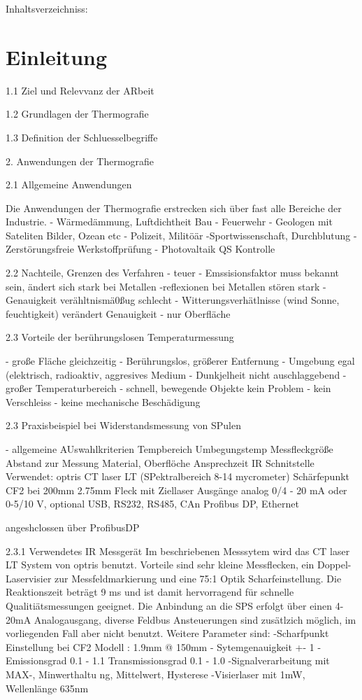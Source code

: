 Inhaltsverzeichniss:

\section{Einleitung}

	1.1 Ziel und Relevvanz der ARbeit

	1.2 Grundlagen der Thermografie

	1.3 Definition der Schluesselbegriffe

2. Anwendungen der Thermografie

	2.1 Allgemeine Anwendungen
		
		Die Anwendungen der Thermografie erstrecken sich über fast alle Bereiche der Industrie.
		- Wärmedämmung, Luftdichtheit Bau
		- Feuerwehr
		- Geologen mit Sateliten Bilder, Ozean etc
		- Polizeit, Militöär
		-Sportwissenschaft, Durchblutung
		- Zerstörungsfreie Werkstoffprüfung
		- Photovaltaik QS Kontrolle
	
	2.2 Nachteile, Grenzen des Verfahren
		- teuer
		- Emssisionsfaktor muss bekannt sein, ändert sich stark bei Metallen
		-reflexionen bei Metallen stören stark
		- Genauigkeit verähltnismä0ßug schlecht
		- Witterungsverhätlnisse (wind Sonne, feuchtigkeit) verändert Genauigkeit
		- nur Oberfläche
	
	
	
	2.3 Vorteile der berührungslosen Temperaturmessung
		
		- große Fläche gleichzeitig
		- Berührungslos, größerer Entfernung
		- Umgebung egal (elektrisch, radioaktiv, aggresives Medium
		- Dunkjelheit nicht auschlaggebend
		- großer Temperaturbereich
		- schnell, bewegende Objekte kein Problem
		- kein Verschleiss
			- keine mechanische Beschädigung
	
	2.3 Praxisbeispiel bei Widerstandsmessung von SPulen
		
		- allgemeine AUswahlkriterien
			Tempbereich
			Umbegungstemp
			Messfleckgröße
			Abstand zur Messung
			Material, Oberflöche
			Ansprechzeit IR
			Schnitstelle
		Verwendet: optris CT laser LT (SPektralbereich 8-14 mycrometer) Schärfepunkt CF2 bei 200mm 2.75mm Fleck mit Ziellaser
		Ausgänge analog 0/4 - 20 mA oder 0-5/10 V,   optional USB, RS232, RS485, CAn Profibus DP, Ethernet

			angeshclossen über ProfibusDP
	
	
	2.3.1  Verwendetes IR Messgerät
		Im beschriebenen Messsytem wird das CT laser LT System von optris benutzt.  
		Vorteile sind sehr kleine Messflecken, ein Doppel-Laservisier zur Messfeldmarkierung und eine 75:1 Optik Scharfeinstellung. Die Reaktionszeit 
		beträgt 9 ms und ist damit hervorragend für schnelle Qualitiätsmessungen geeignet. Die Anbindung an die SPS  erfolgt über einen 4-20mA Analogausgang, 
		diverse Feldbus Ansteuerungen sind zusätlzich möglich, im vorliegenden Fall aber nicht benutzt. Weitere Parameter sind:
		-Scharfpunkt Einstellung bei CF2 Modell : 1.9mm @ 150mm
		- Sytemgenauigkeit +- 1%
		- Emissionsgrad 0.1 - 1.1
		Transmissionsgrad 0.1 - 1.0
		-Signalverarbeitung mit MAX-, Minwerthaltu ng, Mittelwert, Hysterese
		-Visierlaser mit 1mW, Wellenlänge 635nm
		

